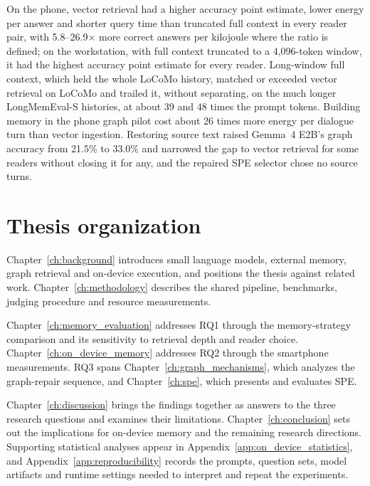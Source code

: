 On the phone, vector retrieval had a higher accuracy point estimate, lower energy per
answer and shorter query time than truncated full context in every reader pair, with
5.8--26.9$\times$ more correct answers per kilojoule where the ratio is defined; on the
workstation, with full context truncated to a 4,096-token window, it had the highest accuracy point
estimate for every reader. Long-window full context, which held the whole LoCoMo history, matched or
exceeded vector retrieval on LoCoMo and trailed it, without separating, on the much longer
LongMemEval-S histories, at about 39 and 48 times the prompt tokens. Building memory in the phone graph pilot cost about 26 times more
energy per dialogue turn than vector ingestion. Restoring source text raised Gemma~4 E2B's
graph accuracy from 21.5\% to 33.0\% and narrowed the gap to vector retrieval for some readers
without closing it for any, and the repaired SPE selector chose no source turns.

\section{Thesis organization}
\label{sec:ch1_organization}

Chapter~\ref{ch:background} introduces small language models, external memory, graph
retrieval and on-device execution, and positions the thesis against related work.
Chapter~\ref{ch:methodology}
describes the shared pipeline, benchmarks, judging procedure and resource measurements.

Chapter~\ref{ch:memory_evaluation} addresses RQ1 through the memory-strategy comparison
and its sensitivity to retrieval depth and reader choice.
Chapter~\ref{ch:on_device_memory} addresses RQ2 through the smartphone measurements.
RQ3 spans Chapter~\ref{ch:graph_mechanisms}, which analyzes the graph-repair sequence,
and Chapter~\ref{ch:spe}, which presents and evaluates SPE.

Chapter~\ref{ch:discussion} brings the findings together as answers to the three research
questions and examines their limitations. Chapter~\ref{ch:conclusion} sets out the implications
for on-device memory and the remaining research directions. Supporting statistical
analyses appear in Appendix~\ref{app:on_device_statistics}, and
Appendix~\ref{app:reproducibility} records the prompts, question sets, model artifacts and
runtime settings needed to interpret and repeat the experiments.
